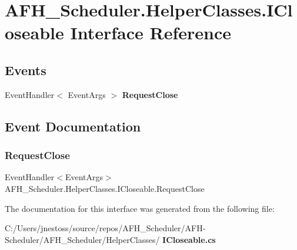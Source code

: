 \section{A\+F\+H\+\_\+\+Scheduler.\+Helper\+Classes.\+I\+Closeable Interface Reference}
\label{interface_a_f_h___scheduler_1_1_helper_classes_1_1_i_closeable}
\subsection*{Events}
\begin{DoxyCompactItemize}
\item 
Event\+Handler$<$ Event\+Args $>$ \textbf{ Request\+Close}
\end{DoxyCompactItemize}


\subsection{Event Documentation}
\mbox{\label{interface_a_f_h___scheduler_1_1_helper_classes_1_1_i_closeable_ad330316fcb85fe36c07d9268c4ec8293}} 
\subsubsection{RequestClose}
{\footnotesize\ttfamily Event\+Handler$<$Event\+Args$>$ A\+F\+H\+\_\+\+Scheduler.\+Helper\+Classes.\+I\+Closeable.\+Request\+Close}



The documentation for this interface was generated from the following file\+:\begin{DoxyCompactItemize}
\item 
C\+:/\+Users/jnestoss/source/repos/\+A\+F\+H\+\_\+\+Scheduler/\+A\+F\+H-\/\+Scheduler/\+A\+F\+H\+\_\+\+Scheduler/\+Helper\+Classes/\textbf{ I\+Closeable.\+cs}\end{DoxyCompactItemize}
